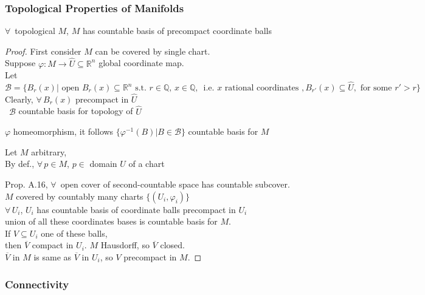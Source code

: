 \subsubsection*{Topological Properties of Manifolds}

\begin{lemma}[1.10]
$\forall \, $ topological $M$, $M$ has countable basis of precompact coordinate balls
\end{lemma}

\begin{proof}
  First consider $M$ can be covered by single chart.  \\
Suppose $\varphi : M \to \widehat{U} \subseteq \mathbb{R}^n$ global coordinate map. \\
Let $\mathcal{B} = \lbrace B_r(x) | \text{ open } B_r(x) \subseteq \mathbb{R}^n \text{ s.t. } r\in \mathbb{Q}, \, x \in \mathbb{Q}, \, \text{ i.e. $x$ rational coordinates }, B_{r'}(x) \subseteq \widehat{U}, \text{ for some } r' > r \rbrace$ \\
Clearly, $\forall \, B_r(x)$ precompact in $\widehat{U}$ \\
\quad \, $\mathcal{B}$ countable basis for topology of $\widehat{U}$

$\varphi$ homeomorphism, it follows $\lbrace \varphi^{-1}(B) | B \in \mathcal{B} \rbrace$ countable basis for $M$

Let $M$ arbitrary, \\
\quad By def., $\forall \, p \in M$, $p \in $ domain $U$ of a chart

Prop. A.16, $\forall \, $ open cover of second-countable space has countable subcover. \\
\quad $M$ covered by countably many charts $\lbrace (U_i, \varphi_i) \rbrace$ \\
$\forall \, U_i$, $U_i$ has countable basis of coordinate balls precompact in $U_i$ \\
union of all these coordinates bases is countable basis for $M$.   \\

If $V \subseteq U_i$ one of these balls,  \\
\quad then $\overline{V}$ compact in $U_i$.  $M$ Hausdorff, so $\overline{V}$ closed.  \\
\quad $\overline{V}$ in $M$ is same as $\overline{V}$ in $U_i$, so $V$ precompact in $M$.   
\end{proof}

\subsubsection*{Connectivity}

